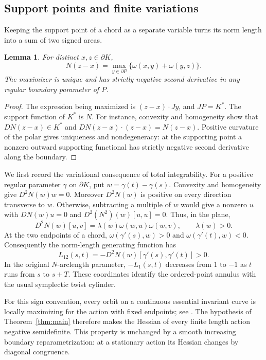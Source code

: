 \documentclass[11pt]{amsart}
\newtheorem{lemma}[theorem]{Lemma}
\theoremstyle{remark}
\begin{document}
\subsection{Support points and finite variations}

Keeping the support point of a chord as a separate variable turns its norm
length into a sum of two signed areas.
\begin{lemma}\label{lem:support}
For distinct $x,z\in\partial K$,
\begin{equation}\label{eq:support}
N(z-x)=\max_{y\in\partial P}
\{\omega(x,y)+\omega(y,z)\}.
\end{equation}
The maximizer is unique and has strictly negative second derivative in
any regular boundary parameter of $P$.
\end{lemma}
\begin{proof}
The expression being maximized is $(z-x)\cdot Jy$, and $JP=K^*$.
The support function of $K^*$ is $N$. For instance, convexity and
homogeneity show that $DN(z-x)\in K^*$ and
$DN(z-x)\cdot(z-x)=N(z-x)$.
Positive curvature of the polar gives uniqueness and nondegeneracy:
at the supporting point a nonzero outward supporting functional has
strictly negative second derivative along the boundary.
\end{proof}

We first record the variational consequence of total integrability.
For a positive regular parameter $\gamma$ on $\partial K$, put
$w=\gamma(t)-\gamma(s)$. Convexity and homogeneity give
$D^2N(w)w=0$. Moreover $D^2N(w)$ is positive on every direction
transverse to $w$. Otherwise, subtracting a multiple of $w$ would
give a nonzero $u$ with $DN(w)u=0$ and
$D^2(N^2)(w)[u,u]=0$. Thus, in the plane,
\[
D^2N(w)[u,v]=\lambda(w)\omega(w,u)\omega(w,v),
\qquad \lambda(w)>0.
\]
At the two endpoints of a chord,
$\omega(\gamma'(s),w)>0$ and $\omega(\gamma'(t),w)<0$.
Consequently the norm-length generating function has
\begin{equation}\label{eq:twist}
L_{12}(s,t)=-D^2N(w)[\gamma'(s),\gamma'(t)]>0.
\end{equation}
In the original $N$-arclength parameter, $-L_1(s,t)$ decreases from
$1$ to $-1$ as $t$ runs from $s$ to $s+T$. These coordinates
identify the ordered-point annulus with the usual symplectic twist
cylinder.

For this sign convention, every orbit on a continuous essential invariant
curve is locally maximizing for the action with fixed endpoints; see
\cite[Section 3, paragraph after Theorem 3.1, p.~5]{Bialy}.
The hypothesis of Theorem~\ref{thm:main} therefore makes the Hessian
of every finite length action negative semidefinite. This property
is unchanged by a smooth increasing boundary reparametrization:
at a stationary action its Hessian changes by diagonal congruence.
\end{document}
